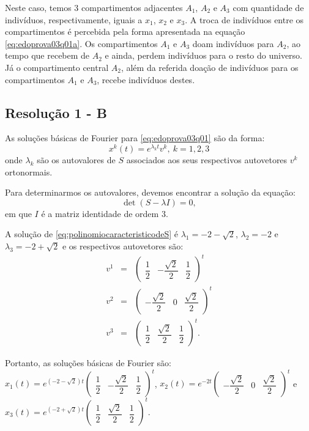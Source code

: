 Neste caso, temos $3$ compartimentos adjacentes $A_1$, $A_2$ e $A_3$ com quantidade de indivíduos, respectivamente, iguais a $x_1$, $x_2$ e $x_3$. 
A troca de indivíduos entre os compartimentos é percebida pela forma apresentada na equação \eqref{eq:edoprova03q01a}. Os compartimentos $A_1$
e $A_3$ doam indivíduos para $A_2$, ao tempo que recebem de $A_2$ e ainda, perdem indivíduos para o resto do universo. Já o compartimento central $A_2$, além da referida doação de indivíduos para os compartimentos $A_1$ e $A_3$, recebe indivíduos destes.


\subsection*{\blue Resolução 1 - \textbf{B}}


As soluções básicas de Fourier para \eqref{eq:edoprova03q01} são da forma:
\[x^k(t) = e^{\lambda_k t} v^k,\ k =1, 2, 3\]
onde \(\lambda_k\) são os autovalores de $S$ associados aos seus respectivos autovetores \(v^k\) ortonormais. 

Para determinarmos os autovalores, devemos encontrar a solução da equação:
\begin{equation}\label{eq:polinomiocaracteristicodeS}
\det(S-\lambda I) = 0,
\end{equation}
em que \(I\) é a matriz identidade de ordem \(3\).

A solução de \eqref{eq:polinomiocaracteristicodeS} é \(\lambda_1 = -2-\sqrt{2}\), \(\lambda_2 = -2\) e \(\lambda_3 = -2+\sqrt{2}\) e os respectivos autovetores são:
\[\begin{array}{rcl}
v^1 &=& \left(\begin{array}{ccc}\dfrac{1}{2} & -\dfrac{\sqrt{2}}{2} & \dfrac{1}{2} \end{array}\right)^t \\[0.5cm]
v^2 &=& \left(\begin{array}{ccc} -\dfrac{\sqrt{2}}{2} & 0 & \dfrac{\sqrt{2}}{2} \end{array}\right)^t \\[0.5cm]
v^3 &=& \left(\begin{array}{ccc}\dfrac{1}{2} & \dfrac{\sqrt{2}}{2} & \dfrac{1}{2} \end{array}\right)^t.
\end{array}\]

Portanto, as soluções básicas de Fourier são:
\(
x_1(t) = e^{(-2-\sqrt{2}) t} \left(\begin{array}{ccc}\dfrac{1}{2} & -\dfrac{\sqrt{2}}{2} & \dfrac{1}{2} \end{array}\right)^t\),
\(x_2(t) = e^{-2 t} \left(\begin{array}{ccc}-\dfrac{\sqrt{2}}{2} & 0 & \dfrac{\sqrt{2}}{2} \end{array}\right)^t\) e 
\(x_3(t) = e^{(-2+\sqrt{2}) t} \left(\begin{array}{ccc} \dfrac{1}{2} & \dfrac{\sqrt{2}}{2} & \dfrac{1}{2} \end{array}\right)^t.
\)




